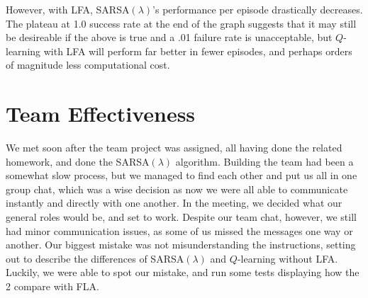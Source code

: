 \documentclass[10pt,conference]{IEEEtran}
\begin{document}
However, with LFA, SARSA\((\lambda)\)'s performance per episode drastically decreases. The plateau at 1.0 success rate at the end of the graph suggests that it may still be desireable if the above is true and a .01 failure rate is unacceptable, but \(Q\)-learning with LFA will perform far better in fewer episodes, and perhaps orders of magnitude less computational cost.

\label{sec:conclusion}

\section{Team Effectiveness}
We met soon after the team project was assigned, all having done the related homework, and done the SARSA\((\lambda)\) algorithm. Building the team had been a somewhat slow process, but we managed to find each other and put us all in one group chat, which was a wise decision as now we were all able to communicate instantly and directly with one another. In the meeting, we decided what our general roles would be, and set to work. Despite our team chat, however, we still had minor communication issues, as some of us missed the messages one way or another. Our biggest mistake was not misunderstanding the instructions, setting out to describe the differences of SARSA\((\lambda)\) and \(Q\)-learning without LFA. Luckily, we were able to spot our mistake, and run some tests displaying how the 2 compare with FLA.
\label{sec:team}




\end{document}
